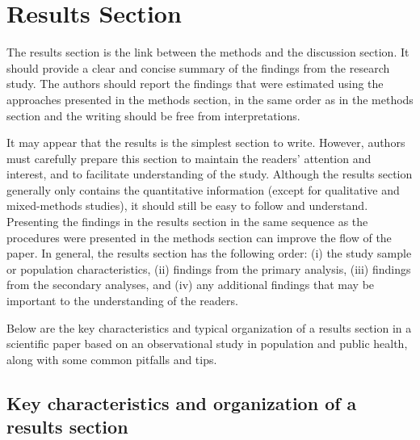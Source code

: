 \documentclass[
]{book}
\begin{document}
\hypertarget{results-section}{%
\chapter{Results Section}\label{results-section}}

The results section is the link between the methods and the discussion section. It should provide a clear and concise summary of the findings from the research study. The authors should report the findings that were estimated using the approaches presented in the methods section, in the same order as in the methods section and the writing should be free from interpretations.

It may appear that the results is the simplest section to write. However, authors must carefully prepare this section to maintain the readers' attention and interest, and to facilitate understanding of the study. Although the results section generally only contains the quantitative information (except for qualitative and mixed-methods studies), it should still be easy to follow and understand. Presenting the findings in the results section in the same sequence as the procedures were presented in the methods section can improve the flow of the paper. In general, the results section has the following order: (i) the study sample or population characteristics, (ii) findings from the primary analysis, (iii) findings from the secondary analyses, and (iv) any additional findings that may be important to the understanding of the readers.

Below are the key characteristics and typical organization of a results section in a scientific paper based on an observational study in population and public health, along with some common pitfalls and tips.

\hypertarget{key-characteristics-and-organization-of-a-results-section}{%
\section{Key characteristics and organization of a results section}\label{key-characteristics-and-organization-of-a-results-section}}
\end{document}
